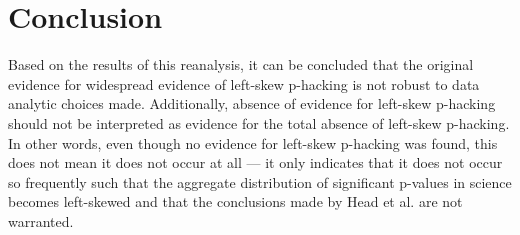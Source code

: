 \section*{Conclusion}
Based on the results of this reanalysis, it can be concluded that the original evidence for widespread evidence of left-skew p-hacking \cite{Head_2015} is not robust to data analytic choices made. Additionally, absence of evidence for left-skew p-hacking should not be interpreted as evidence for the total absence of left-skew p-hacking. In other words, even though no evidence for left-skew p-hacking was found, this does not mean it does not occur at all — it only indicates that it does not occur so frequently such that the aggregate distribution of significant p-values in science becomes left-skewed and that the conclusions made by Head et al. are not warranted.
